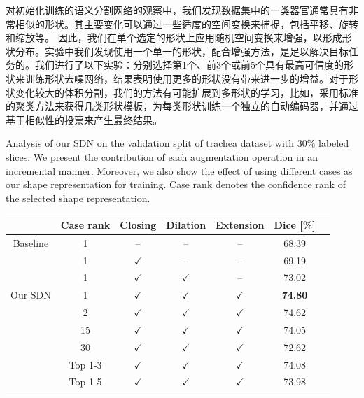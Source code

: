 对初始化训练的语义分割网络的观察中，我们发现数据集中的一类器官通常具有非常相似的形状。其主要变化可以通过一些适度的空间变换来捕捉，包括平移、旋转和缩放等。
因此，我们在单个选定的形状上应用随机空间变换来增强，以形成形状分布。实验中我们发现使用一个单一的形状，配合增强方法，是足以解决目标任务的。我们进行了以下实验：分别选择第1个、前3个或前5个具有最高可信度的形状来训练形状去噪网络，结果表明使用更多的形状没有带来进一步的增益。对于形状变化较大的体积分割，我们的方法有可能扩展到多形状的学习，比如，采用标准的聚类方法来获得几类形状模板，为每类形状训练一个独立的自动编码器，并通过基于相似性的投票来产生最终结果。

    \begin{table}[t!]
        \centering
        {Analysis of our SDN on the validation split of trachea dataset with 30\% labeled slices. We present the contribution of each augmentation operation in an incremental manner. Moreover, we also show the effect of using different cases as our shape representation for training. Case rank denotes the confidence rank of the selected shape representation.}
        \label{tab:ablation_aug}        
            \begin{tabular}{c c c c c c c}
                \toprule
                & Case rank & Closing     & Dilation     & Extension      & Dice [\%]  \\ \midrule
                Baseline & 1 & --              & --                & --                & 68.39        \\
                & 1 & $\checkmark$    & --                & --                & 69.19         \\ %
                & 1 & $\checkmark$    & $\checkmark$      & --                & 73.02        \\ %
                Our SDN  & 1 & $\checkmark$    & $\checkmark$      & $\checkmark$      & \textbf{74.80}             \\ \midrule
                & 2 & $\checkmark$    & $\checkmark$      & $\checkmark$      & 74.62             \\ 
                & 15 & $\checkmark$    & $\checkmark$      & $\checkmark$      & 74.05             \\ 
                & 30 & $\checkmark$    & $\checkmark$      & $\checkmark$      & 72.62             \\ 
                \midrule
                & Top 1-3 & $\checkmark$    & $\checkmark$      & $\checkmark$      & 74.08             \\
                & Top 1-5 & $\checkmark$    & $\checkmark$      & $\checkmark$      & 73.98             \\
                \bottomrule
            \end{tabular}
    \end{table}






